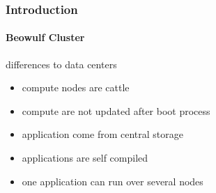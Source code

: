 \documentclass[aspectratio=169]{beamer}
\begin{document}
\begin{frame}[fragile]
\frametitle{Introduction}
\framesubtitle{Beowulf Cluster}
\begin{block}{differences to data centers}
  \begin{itemize}
    \item compute nodes are cattle
    \item compute are not updated after boot process
    \item application come from central storage
    \item applications are self compiled
    \item one application can run over several nodes
  \end{itemize}
\end{block}
\end{frame}
%
%
%
%
%
%
%
%
%
%
%
\end{document}
